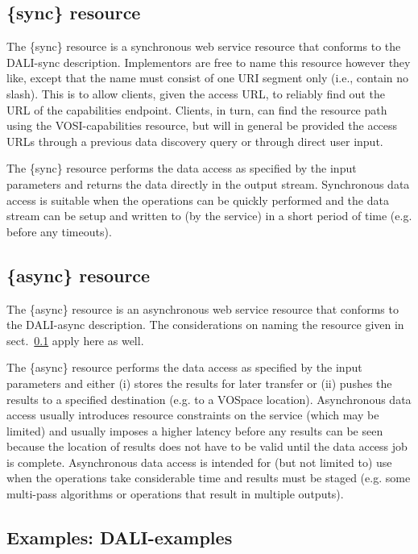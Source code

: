\documentclass[11pt,a4paper]{ivoa}
\begin{document}
\subsection{\{sync\} resource}
\label{sec:sync}

The \{sync\} resource is a synchronous web service resource
that conforms to the DALI-sync description. Implementors
are free to name this resource however
they like, except that the name must consist of one URI segment only (i.e.,
contain no slash).  This is to allow clients, given the access URL, 
to reliably find out the URL of the capabilities endpoint. 
Clients, in turn, can find the resource path using the
VOSI-capabilities resource, but will in general be provided the access
URLs through a previous data discovery query or through direct user
input.

The \{sync\} resource performs the data access as specified by
the input parameters and returns the data directly in the
output stream. Synchronous data access is suitable when the
operations can be quickly performed and the data stream can
be setup and written to (by the service) in a short period
of time (e.g. before any timeouts).

\subsection{\{async\} resource}
\label{sec:async}

The \{async\} resource is an asynchronous web service resource
that conforms to the DALI-async description.  The considerations on
naming the resource given in sect.~\ref{sec:sync} apply here as well.

The \{async\} resource performs the data access as specified
by the input parameters and either (i) stores the results
for later transfer or (ii) pushes the results to a specified
destination (e.g. to a VOSpace location). Asynchronous data
access usually introduces resource constraints on the
service (which may be limited) and usually imposes a higher
latency before any results can be seen because the location
of results does not have to be valid until the data access
job is complete. Asynchronous data access is intended for
(but not limited to) use when the operations take
considerable time and results must be staged (e.g. some
multi-pass algorithms or operations that result in multiple
outputs).

\subsection{Examples: DALI-examples}
\label{sec:examples}
\end{document}
